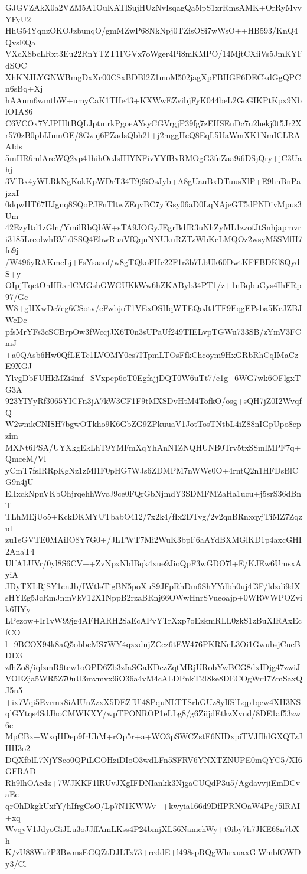 GJGVZAkX0a2VZM5A1OuKATlSujHUzNvIsqagQa5lpS1xrRmsAMK+OrRyMvvYFyU2
HhG54YqnzOKOJzbunqO/gmMZwP68NkNpj0TZisOSi7wWsO++HB593/KnQ4QvsEQa
VXcX8bcLRxt3Eu22RnYTZT1FGVx7oWger4Pi8mKMPO/14MjtCXiiVs5JmKYFdSOC
XhKNJLYGNWBmgDxXc00CSxBDBl2Z1moM502jagXpFBHGF6DECkdGgQPCn6sBq+Xj
hAAum6wmtbW+umyCaK1THe43+KXWwEZvibjFyK044beL2GcGIKPtKpx9NblO1A86
C6VCOx7YJPHItBQLJptmrkPgoeAYsyCGVrgjP39fg7zEHSEuDc7u2hekj0t5Jr2X
r570zB0pbIJmnOE/8Gzuj6PZadsQbh21+j2mggHcQ8EqL5UaWmXK1NmICLRAAIds
5mHR6mlAreWQ2vp41hihOeJsIHYNFivYYfBvRMOgG3fnZaa9i6DSjQry+jC3Uahj
3VlBx4yWLRkNgKokKpWDrT34T9j9iOsJyb+A8gUauBxDTuusXlP+E9hnBnPajzxI
0dqwHT67HJgnq8SQoPJFnTltwZEqvBC7yfGsy06aD0LqNAjeGT5dPNDivMpus3Um
42EzyItd1zGln/YmilRbQbW+sTA9JOGyJEgrBdfR3uNhZyML1zzofJtSnhjapmvr
i3185LreolwhRVb0SSQ4EhwRuaVfQqnNNUkuRZTzWbKcLMQOz2wsyM5SMfH7fo9j
/W496yRAKmcLj+FsYsaaof/w8gTQkoFHc22F1r3b7LbUk60DwtKFFBDKl8QydS+y
OIpjTqctOnHRxrlCMGshGWGUKkWw6hZKAByb34PT1/z+1nBqbuGys4IhFRp97/Gc
W8+gHXwDc7eg6CSotv/eFwbjoT1VExOSHqWTEQoJt1TF9EqgEPsba5KeJZBJWcDc
pfsMrYFs3cSCBrpOw3fWccjJX6T0n3sUPaUf249TIELvpTGWu733SB/zYmV3FCmJ
+a0QAsb6Hw0QfLETc1LVOMY0es7ITpmLTOsFfkChcoym9HxGRbRhCqIMaCzE9XGJ
YlvgDbFUHkMZi4mf+SVxpep6oT0EgfajjDQT0W6uTt7/e1g+6WG7wk6OFlgxTG3A
923YIYyRf3065YICFn3jA7kW3CF1F9tMXSDvHtM4TofkO/osg+sQH7jZ0I2WvqfQ
W2wmkCNISH7bgwOTkho9K6GbZG9ZPkuuaV1JotTosTNtbL4iZ88nIGpUpo8epzim
MXNt6PSA/UYXkgEkLhT9YMFmXqYhAnN1ZNQHUNB0Trv5txSSmlMPF7q+QmceM/Vl
yCmT7fsIRRpKgNz1zMl1F0pHG7WJs6ZDMPM7nWWe0O+4rntQ2n1HFDsBlCG9n4jU
ElIxckNpnVKbOhjrqehhWvcJ9ce0FQrGbNjmdY3SDMFMZaHa1ucu+j5srS36dBnT
TLhMEjUo5+KckDKMYUTbabO412/7x2k4/fIx2DTvg/2v2qnBRnxqyjTiMZ7Zqzul
zu1eGVTE0MAiIO8Y7G0+/JLTWT7Mi2WuK3bpF6aAYdBXMGlKD1p4axcGHI2AnaT4
UlfALUVr/0yl8S6CV++ZvNpxNbIBqk4xue9JioQpF3wGDO7l+E/KJEw6UmsxAyiA
JDyTXLRjSY1cnJb/IWtleTigBN5poXuS9JFpRhDm6ShYYdbh0uj4f3F/ldzdi9dX
sHYEg5JcRmJnmVkV12X1NppB2rzaBRnj66OWwHnrSVueoajp+0WRWWPOZvik6HYy
LPezow+Ir1vW99jg4AFHARH2SaEcAPvYTrXxp7oEzkmRLL0zkS1zBuXIRAxEcfCO
l+9BCOX94k8aQ5obbcMS7WY4qzxdujZCcz6tEW476PKRNeL3Oi1GwubsjCucBDD3
zfhZo8/iqfzmR9tew1oOPD6Zb3zIaSGaKDczZqtMRjURobYwBCG8dxIDjg47zwiJ
VOEZja5WR5Z70uU3mvmvx9iO36a4vM4cALDPnkT2I8ke8DECOgWr47ZmSaxQJ5n5
+ix7Vqi5Evrmx8iAIUnZzxX5DEZfUl48PquNLTTSrhGUz8yIfSlLqp1qew4XH3NS
qlGYtqs4SdJhoCMWKXY/wpTPONROP1eLLg8/g6ZiijdEtkzXvnd/8DE1af53zw6e
MpCBx+WxqHDep9frUhM+rOp5r+a+WO3pSWCZstF6NIDxpiTVJfIhlGXQTzJHH3o2
DQXfblL7NjYSco0QPiLGOHziDIoO3wdLFn5SFRV6YNXTZNUPE0mQYC5/XI6GFRAD
Rh9lhOAedz+7WJKKF1lRUvJXgIFDNIankk3NjgaCUQdP3u5/AgdavvjiEmDCvaEe
qrOhDkgkUxfY/hIfrgCoO/Lp7N1KWWv++kwyia166d9DfIPRNOaW4Pq/5lRAI+xq
WvqyV1JdyoGiJLu3oJJffAmLKss4P24bmjXL56NamchWy+t9iby7h7JKE68n7bXh
K/zU88Wu7P3BwmsEGQZtDJLTx73+rcddE+l498spRQgWhrxuaxGiWmbfOWDy3/Cl
